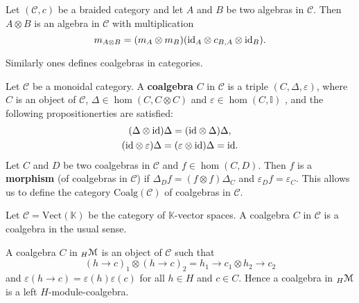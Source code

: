 
\begin{example}
Let $(\mathcal{C},c)$ be a braided category and let $A$ and $B$ be two algebras
in $\mathcal{C}$. Then $A\otimes B$ is an algebra in $\mathcal{C}$ with
multiplication 
\[
m_{A\otimes B}=(m_A\otimes m_B)(\mathrm{id}_A\otimes c_{B,A}\otimes \mathrm{id}_B).
\]
\end{example}

Similarly ones defines coalgebras in categories.

\begin{definition}
Let $\mathcal{C}$ be a monoidal category. A \textbf{coalgebra}
$C$ in $\mathcal{C}$ is a triple $(C,\Delta,\varepsilon)$, where
$C$ is an object of $\mathcal{C}$, $\Delta\in\hom(C,C\otimes C)$
and $\varepsilon\in\hom(C,\mathbb{I})$ , and the following propositionerties
are satisfied: 
\begin{gather*}
(\Delta\otimes\mathrm{id})\Delta=(\mathrm{id}\otimes\Delta)\Delta,\\
(\mathrm{id}\otimes\varepsilon)\Delta=(\varepsilon\otimes\mathrm{id})\Delta=\mathrm{id}.
\end{gather*}
Let $C$ and $D$ be two coalgebras in $\mathcal{C}$ and $f\in\hom(C,D)$.
Then $f$ is a \textbf{morphism} (of coalgebras in $\mathcal{C}$)
if $\Delta_{D}f=(f\otimes f)\Delta_{C}$ and $\varepsilon_{D}f=\varepsilon_{C}$.
This allows us to define the category $\mathrm{Coalg}(\mathcal{C})$
of coalgebras in $\mathcal{C}$.
\end{definition}

\begin{example}
Let $\mathcal{C}=\mathrm{Vect}(\mathbb{K})$ be the category of $\mathbb{K}$-vector
spaces. A coalgebra $C$ in $\mathcal{C}$ is a coalgebra in the usual sense.
\end{example}

\begin{example}
A coalgebra $C$ in ${}_{H}\mathcal{M}$ is an object of $\mathcal{C}$ such that 
\[
(h\to c)_{1}\otimes(h\to c)_{2}=h_{1}\to c_{1}\otimes h_{2}\to c_{2}
\]
and $\varepsilon(h\to c)=\varepsilon(h)\varepsilon(c)$ for all $h\in H$ and
$c\in C$. Hence a coalgebra in ${}_{H}\mathcal{M}$ is a left $H$-module-coalgebra.
\end{example}

